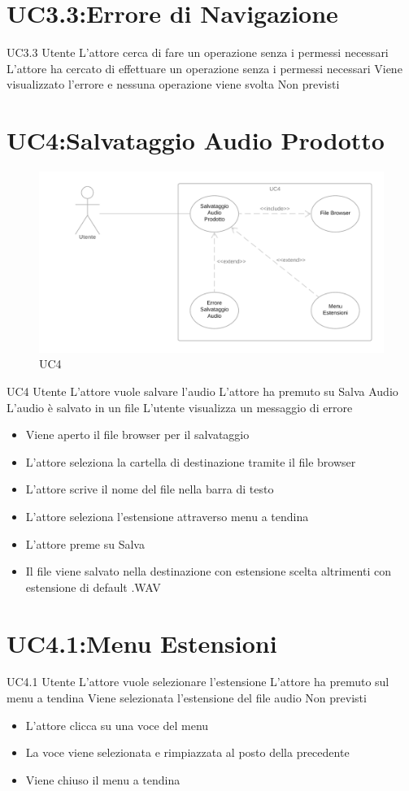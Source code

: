 \documentclass[../AnalisideiRequisiti.tex]{subfiles}
\begin{document}
\section{UC3.3:Errore di Navigazione}
\UserCase
{UC3.3}
{Utente}
{}
{L'attore cerca di fare un operazione senza i permessi necessari}
{L'attore ha cercato di effettuare un operazione senza i permessi necessari}
{Viene visualizzato l'errore e nessuna operazione viene svolta}
{Non previsti}
{}

\section{UC4:Salvataggio Audio Prodotto}
\begin{figure}[H]
	\caption{UC4}
	\centering
	\includegraphics[width=\textwidth]{../img/UC04.png}
\end{figure}
\UserCase
{UC4}
{Utente}
{}
{L'attore vuole salvare l'audio}
{L'attore ha premuto su Salva Audio}
{L'audio è salvato in un file}
{L'utente visualizza un messaggio di errore }
{
		\begin{itemize}
		\item{} Viene aperto il file browser per il salvataggio
		\item{} L'attore seleziona la cartella di destinazione tramite il file browser 
		\item{} L'attore scrive il nome del file nella barra di testo
		\item{} L'attore seleziona l'estensione attraverso menu a tendina 
		\item{} L'attore preme su Salva 
		\item{} Il file viene salvato nella destinazione con estensione scelta altrimenti con estensione di default .WAV
\end{itemize}
}
\section{UC4.1:Menu Estensioni}
\UserCase
{UC4.1}
{Utente}
{}
{L'attore vuole selezionare l'estensione}
{L'attore ha premuto sul menu a tendina}
{Viene selezionata l'estensione del file audio}
{Non previsti}
{
\begin{itemize}
	\item{} L'attore clicca su una voce del menu
	\item{} La voce viene selezionata e rimpiazzata al posto della precedente
	\item{} Viene chiuso il menu a tendina

\end{itemize}
}		
\end{document}
